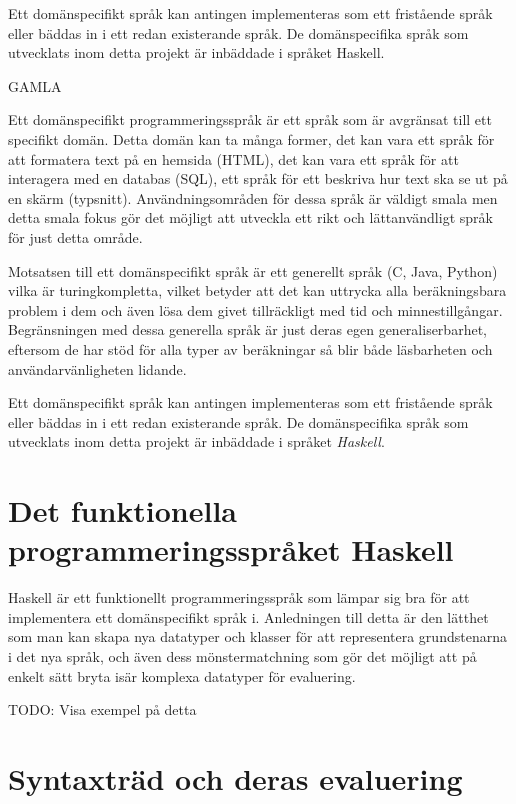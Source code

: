 \begin{draft}
Ett domänspecifikt språk kan antingen implementeras som ett fristående språk eller bäddas in i ett redan existerande språk. De domänspecifika språk som   utvecklats inom detta projekt är inbäddade i språket Haskell.

GAMLA


  Ett domänspecifikt programmeringsspråk är ett språk som är avgränsat till ett
  specifikt domän. Detta domän kan ta många former, det kan vara ett språk för
  att formatera text på en hemsida (HTML), det kan vara ett språk för att
  interagera med en databas (SQL), ett språk för ett beskriva hur text ska se
  ut på en skärm  (typsnitt). Användningsområden för dessa språk är väldigt
  smala men detta smala fokus gör det möjligt att utveckla ett rikt och
  lättanvändligt språk för just detta område.

  Motsatsen till ett domänspecifikt språk är ett generellt språk (C, Java,
  Python) vilka är turingkompletta, vilket betyder att det kan uttrycka alla
  beräkningsbara problem i dem och även lösa dem givet tillräckligt med tid och
   minnestillgångar. Begränsningen med dessa generella språk är
  just deras egen generaliserbarhet, eftersom de har stöd för alla typer av
  beräkningar så blir både läsbarheten och användarvänligheten lidande.

  Ett domänspecifikt språk kan antingen implementeras som ett fristående språk
  eller bäddas in i ett redan existerande språk. De domänspecifika språk som
  utvecklats inom detta projekt är inbäddade i språket \textit{Haskell}.
\end{draft}

\section{Det funktionella programmeringsspråket Haskell}

\begin{binge}
  Haskell är ett funktionellt programmeringsspråk som lämpar sig bra för att
  implementera ett domänspecifikt språk i. Anledningen till detta är den lätthet
  som man kan skapa nya datatyper och klasser för att representera grundstenarna
  i det nya språk, och även dess mönstermatchning som gör det möjligt att på
  enkelt sätt bryta isär komplexa datatyper för evaluering.

  TODO: Visa exempel på detta
\end{binge}

\section{Syntaxträd och deras evaluering}

